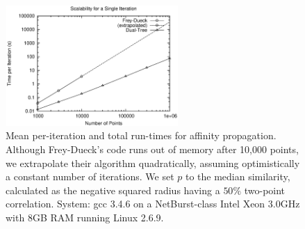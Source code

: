 \documentclass{article}
\begin{document}
\begin{figure}
  \begin{minipage}{2.8in}
    \includegraphics[width=2.6in,height=1.8in]{r-speed.ps}
  \end{minipage}
  \begin{minipage}{2.5in}
      \caption{\label{fig:speed}\footnotesize Mean per-iteration and total run-times for affinity propagation.
	Although Frey-Dueck's code runs out of memory after 10,000 points, we extrapolate their algorithm quadratically, assuming optimistically a constant number of iterations.
	We set $p$ to the median similarity, calculated as the negative squared radius having a $50\%$ two-point correlation.
	System: gcc 3.4.6 on a NetBurst-class Intel Xeon 3.0GHz with 8GB RAM running Linux 2.6.9.}
  \end{minipage}
\end{figure}

\appendix
\end{document}
